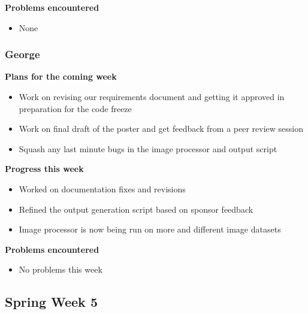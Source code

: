 \documentclass[10pt, onecolumn, draftclsnofoot, letterpaper, compsoc]{IEEEtran}
\begin{document}
    \noindent \textbf{Problems encountered}

    \begin{itemize}

    \item None

    \end{itemize}

    \subsubsection{George}

    \noindent \textbf{Plans for the coming week}

    \begin{itemize}

    \item Work on revising our requirements document and getting it approved in preparation for the code freeze
    \item Work on final draft of the poster and get feedback from a peer review session
    \item Squash any last minute bugs in the image processor and output script

    \end{itemize}

    \noindent \textbf{Progress this week}

    \begin{itemize}

    \item Worked on documentation fixes and revisions
    \item Refined the output generation script based on sponsor feedback
    \item Image processor is now being run on more and different image datasets

    \end{itemize}

    \noindent \textbf{Problems encountered}

    \begin{itemize}

    \item No problems this week

    \end{itemize}

\subsection{Spring Week 5}
\end{document}
